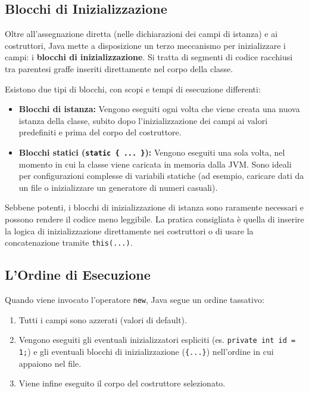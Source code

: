 \subsection{Blocchi di Inizializzazione}

Oltre all'assegnazione diretta (nelle dichiarazioni dei campi di istanza) e ai costruttori, Java mette a disposizione un terzo meccanismo per inizializzare i campi: i \textbf{blocchi di inizializzazione}. Si tratta di segmenti di codice racchiusi tra parentesi graffe inseriti direttamente nel corpo della classe.

Esistono due tipi di blocchi, con scopi e tempi di esecuzione differenti:

\begin{itemize}
    \item \textbf{Blocchi di istanza:} Vengono eseguiti ogni volta che viene creata una nuova istanza della classe, subito dopo l'inizializzazione dei campi ai valori predefiniti e prima del corpo del costruttore.
    \item \textbf{Blocchi statici (\texttt{static \{ ... \}}):} Vengono eseguiti una sola volta, nel momento in cui la classe viene caricata in memoria dalla JVM. Sono ideali per configurazioni complesse di variabili statiche (ad esempio, caricare dati da un file o inizializzare un generatore di numeri casuali).
\end{itemize}

\begin{observation}
    Sebbene potenti, i blocchi di inizializzazione di istanza sono raramente necessari e possono rendere il codice meno leggibile. La pratica consigliata è quella di inserire la logica di inizializzazione direttamente nei costruttori o di usare la concatenazione tramite \texttt{this(...)}.
\end{observation}

\subsection{L'Ordine di Esecuzione}
Quando viene invocato l'operatore \texttt{new}, Java segue un ordine tassativo:
\begin{enumerate}
    \item Tutti i campi sono azzerati (valori di default).
    \item Vengono eseguiti gli eventuali inizializzatori espliciti (es. \texttt{private int id = 1;}) e gli eventuali blocchi di inizializzazione (\texttt{\{...\}}) nell'ordine in cui appaiono nel file.
    \item Viene infine eseguito il corpo del costruttore selezionato.
\end{enumerate}

